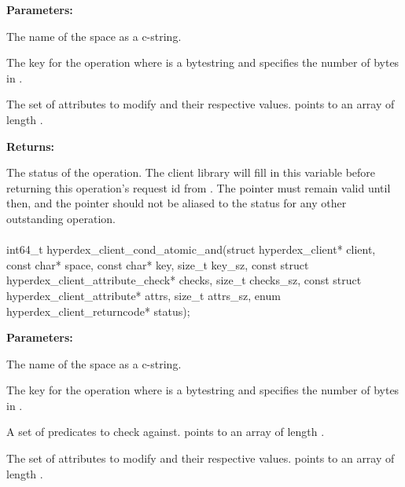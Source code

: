 \noindent\textbf{Parameters:}
\begin{description}[labelindent=\widthof{{\code{attrs}, \code{attrs\_sz}}},leftmargin=*,noitemsep,nolistsep,align=right]
\item[\code{space}] The name of the space as a c-string.
\item[\code{key}, \code{key\_sz}] The key for the operation where  is a bytestring and  specifies the number of bytes in .
\item[\code{attrs}, \code{attrs\_sz}] The set of attributes to modify and their respective values.   points to an array of length .
\end{description}

\noindent\textbf{Returns:}
\begin{description}[labelindent=\widthof{{\code{status}}},leftmargin=*,noitemsep,nolistsep,align=right]
\item[\code{status}] The status of the operation.  The client library will fill in this variable before returning this operation's request id from .  The pointer must remain valid until then, and the pointer should not be aliased to the status for any other outstanding operation.
\end{description}

\paragraph{}
\begin{ccode}
int64_t hyperdex_client_cond_atomic_and(struct hyperdex_client* client,
                const char* space,
                const char* key, size_t key_sz,
                const struct hyperdex_client_attribute_check* checks, size_t checks_sz,
                const struct hyperdex_client_attribute* attrs, size_t attrs_sz,
                enum hyperdex_client_returncode* status);
\end{ccode}
\funcdesc 

\noindent\textbf{Parameters:}
\begin{description}[labelindent=\widthof{{\code{checks}, \code{checks\_sz}}},leftmargin=*,noitemsep,nolistsep,align=right]
\item[\code{space}] The name of the space as a c-string.
\item[\code{key}, \code{key\_sz}] The key for the operation where  is a bytestring and  specifies the number of bytes in .
\item[\code{checks}, \code{checks\_sz}] A set of predicates to check against.   points to an array of length .
\item[\code{attrs}, \code{attrs\_sz}] The set of attributes to modify and their respective values.   points to an array of length .
\end{description}

